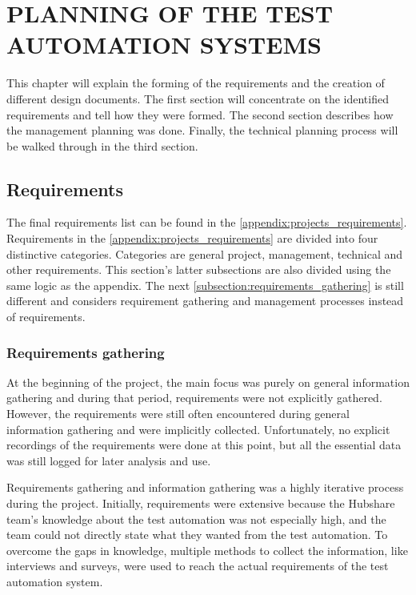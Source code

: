 \chapter{PLANNING OF THE TEST AUTOMATION SYSTEMS}\label{chapter:planning_of_the_test_automation_systems}
This chapter will explain the forming of the requirements and the creation of different design documents. The first section will concentrate on the identified requirements and tell how they were formed. The second section describes how the management planning was done. Finally, the technical planning process will be walked through in the third section.

\section{Requirements}
The final requirements list can be found in the \autoref{appendix:projects_requirements}. Requirements in the \autoref{appendix:projects_requirements} are divided into four distinctive categories. Categories are general project, management, technical and other requirements. This section's latter subsections are also divided using the same logic as the appendix. The next \autoref{subsection:requirements_gathering} is still different and considers requirement gathering and management processes instead of requirements.

\subsection{Requirements gathering}\label{subsection:requirements_gathering}
At the beginning of the project, the main focus was purely on general information gathering and during that period, requirements were not explicitly gathered. However, the requirements were still often encountered during general information gathering and were implicitly collected. Unfortunately, no explicit recordings of the requirements were done at this point, but all the essential data was still logged for later analysis and use.

Requirements gathering and information gathering was a highly iterative process during the project. Initially, requirements were extensive because the Hubshare team's knowledge about the test automation was not especially high, and the team could not directly state what they wanted from the test automation. To overcome the gaps in knowledge, multiple methods to collect the information, like interviews and surveys, were used to reach the actual requirements of the test automation system.

